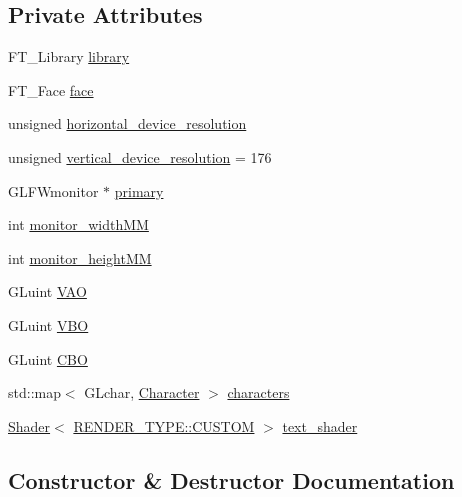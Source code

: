 \subsection*{Private Attributes}
\begin{DoxyCompactItemize}
\item 
F\+T\+\_\+\+Library \mbox{\hyperlink{classText_af0d723786485fad392cebab1458e0196}{library}}
\item 
F\+T\+\_\+\+Face \mbox{\hyperlink{classText_aead69571b262356d6e4641050485d492}{face}}
\item 
unsigned \mbox{\hyperlink{classText_a09fe1fc4ba6ed5e64dcbef2ac2c56f26}{horizontal\+\_\+device\+\_\+resolution}}
\item 
unsigned \mbox{\hyperlink{classText_aeac01a7f249d00dacd246abfd6f35f91}{vertical\+\_\+device\+\_\+resolution}} = 176
\item 
G\+L\+F\+Wmonitor $\ast$ \mbox{\hyperlink{classText_ad7d37381d10639257b7bb9beccbe36a5}{primary}}
\item 
int \mbox{\hyperlink{classText_ae4127137a06a53bf5bf7cb838bd0a4ff}{monitor\+\_\+width\+MM}}
\item 
int \mbox{\hyperlink{classText_a49c1ab744e7a55b4c9e55ac57527bfc8}{monitor\+\_\+height\+MM}}
\item 
G\+Luint \mbox{\hyperlink{classText_a485e2c31f7a6d7a5a7d360f00818d751}{V\+AO}}
\item 
G\+Luint \mbox{\hyperlink{classText_aaac524c6d42c895e6cbf962538f72b3a}{V\+BO}}
\item 
G\+Luint \mbox{\hyperlink{classText_a0904900eab3438a866585562109cb586}{C\+BO}}
\item 
std\+::map$<$ G\+Lchar, \mbox{\hyperlink{structText_1_1Character}{Character}} $>$ \mbox{\hyperlink{classText_aab2c5b22cf4c381151ccba967b104614}{characters}}
\item 
\mbox{\hyperlink{classShader}{Shader}}$<$ \mbox{\hyperlink{shader__class_8hpp_a24e288e18eb7b6e01de7565001fedb60a72baef04098f035e8a320b03ad197818}{R\+E\+N\+D\+E\+R\+\_\+\+T\+Y\+P\+E\+::\+C\+U\+S\+T\+OM}} $>$ \mbox{\hyperlink{classText_aceda97361cb73286cd090db34aa10084}{text\+\_\+shader}}
\end{DoxyCompactItemize}


\subsection{Constructor \& Destructor Documentation}
\mbox{\label{classText_ac76e1d24db004590f1e03da44dfb04dd}} 
